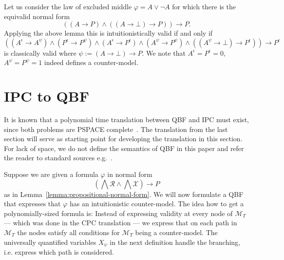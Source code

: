 \documentclass[runningheads]{llncs}
\begin{document}
\begin{example}
	Let us consider the law of excluded middle $\varphi = A\vee\neg A$ for which there is the equivalid normal form
	$$((A\to P)\wedge ((A\to \bot)\to P))\to P.$$
	Applying the above lemma this is intuitionistically valid if and only if $$((A^\epsilon\to A^\psi)\wedge(P^\epsilon\to P^\psi)\wedge(A^\epsilon\to P^\epsilon)\wedge(A^\psi\to P^\psi)\wedge ((A^\psi\to \bot)\to P^\epsilon))\to P^\epsilon$$ is classically valid where $\psi := (A\to \bot)\to P$.
	We note that $A^\epsilon  = P^\epsilon = 0$, $A^\psi = P^{\psi}  = 1$ indeed defines a counter-model.
\end{example}	

\section{IPC to QBF}

It is known that a polynomial time translation between QBF and IPC must exist, since both problems are PSPACE complete~\cite{garey1979computers,statman1979intuitionistic}.
The translation from the last section will serve as starting point for developing the translation in this section.
For lack of space, we do not define the semantics of QBF in this paper and refer the reader to standard sources e.g.~\cite{series/faia/2009-185}.

Suppose we are given a formula $\varphi$ in normal form $$\left(\bigwedge\mathcal R\wedge\bigwedge\mathcal X\right)\to P$$ as in Lemma~\ref{lemma:propositional-normal-form}. We will now formulate a QBF that expresses that $\varphi$ has an intuitionistic counter-model. The idea how to get a polynomially-sized formula is: Instead of expressing validity at every node of $\mathcal M_T$ --- which was done in the CPC translation --- we express that on each path in $\mathcal M_T$ the nodes satisfy all conditions for $\mathcal M_T$ being a counter-model. The universally quantified variables $X_\psi$ in the next definition handle the branching, i.e. express which path is considered.
\end{document}
